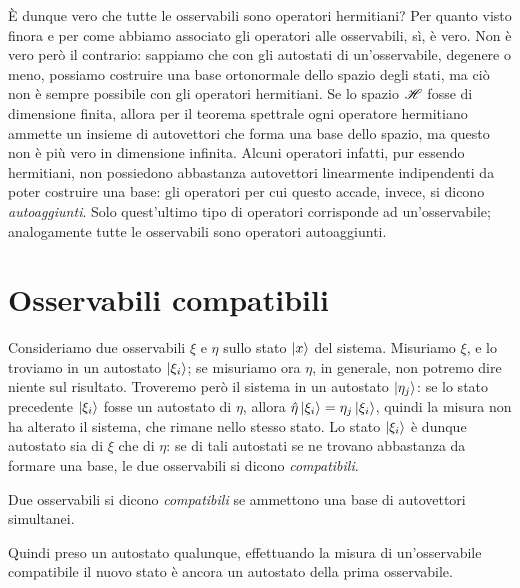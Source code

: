 È dunque vero che tutte le osservabili sono operatori hermitiani?
Per quanto visto finora e per come abbiamo associato gli operatori alle osservabili, s\`i, è vero.
Non è vero però il contrario: sappiamo che con gli autostati di un'osservabile, degenere o meno, possiamo costruire una base ortonormale dello spazio degli stati, ma ciò non è sempre possibile con gli operatori hermitiani.
Se lo spazio $\mathscr H$ fosse di dimensione finita, allora per il teorema spettrale ogni operatore hermitiano ammette un insieme di autovettori che forma una base dello spazio, ma questo non è più vero in dimensione infinita.
Alcuni operatori infatti, pur essendo hermitiani, non possiedono abbastanza autovettori linearmente indipendenti da poter costruire una base: gli operatori per cui questo accade, invece, si dicono \emph{autoaggiunti}.
Solo quest'ultimo tipo di operatori corrisponde ad un'osservabile; analogamente tutte le osservabili sono operatori autoaggiunti.

\section{Osservabili compatibili}
Consideriamo due osservabili $\xi$ e $\eta$ sullo stato $\left|{x}\right\rangle$ del sistema.
Misuriamo $\xi$, e lo troviamo in un autostato $\left|{\xi_i}\right\rangle$; se misuriamo ora $\eta$, in generale, non potremo dire niente sul risultato.
Troveremo però il sistema in un autostato $\left|{\eta_j}\right\rangle$: se lo stato precedente $\left|{\xi_i}\right\rangle$ fosse un autostato di $\eta$, allora $\hat{\eta}\left|{\xi_i}\right\rangle=\eta_j\left|{\xi_i}\right\rangle$, quindi la misura non ha alterato il sistema, che rimane nello stesso stato.
Lo stato $\left|{\xi_i}\right\rangle$ è dunque autostato sia di $\xi$ che di $\eta$: se di tali autostati se ne trovano abbastanza da formare una base, le due osservabili si dicono \emph{compatibili}.
\begin{definizione} \label{d:osservabili-compatibili}
	Due osservabili si dicono \emph{compatibili} se ammettono una base di autovettori simultanei.
\end{definizione}
Quindi preso un autostato qualunque, effettuando la misura di un'osservabile compatibile il nuovo stato è ancora un autostato della prima osservabile.

